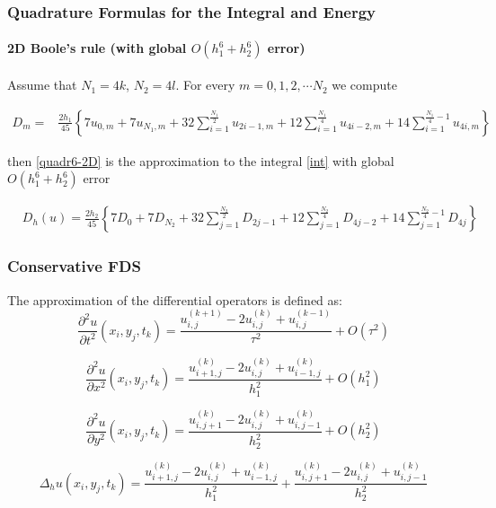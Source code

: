 \documentclass{beamer}
\begin{document}
\begin{frame}
\frametitle{Quadrature Formulas for the Integral and Energy}
\framesubtitle{2D Boole's rule (with global $O(h_1^6+h_2^6)$ error)}

Assume that $N_1=4k$, $N_2=4 l$.
For every $m=0,1,2,\cdots N_2$ we compute

\begin{align*}
D_m =& \frac{2h_1}{45} 
\left\{
7u_{0,m}+7u_{N_1,m}+32 \sum_{i=1}^{\frac{N_1}{2}}u_{2i-1,m}
+12\sum_{i=1}^{\frac{N_1}{4}}u_{4i-2,m}
+14 \sum_{i=1}^{\frac{N_1}{4}-1}u_{4i,m}
\right\}
\end{align*}

then \eqref{quadr6-2D} is the approximation to the integral \eqref{int} with global $O(h_1^6+h_2^6)$ error

\begin{align}\label{quadr6-2D}
&D_h(u) =
\frac{2h_2}{45} 
\left\{
7D_{0}+7D_{N_2}+32 \sum_{j=1}^{\frac{N_2}{2}}D_{2j-1}
+12\sum_{j=1}^{\frac{N_2}{4}}D_{4j-2}
+14 \sum_{j=1}^{\frac{N_2}{4}-1}D_{4j}
\right\}
\end{align}
\end{frame}


\begin{frame}
\frametitle{Conservative FDS}
The approximation of the differential operators is defined as:
\begin{equation}
\frac{\partial^2 u}{\partial t^2}(x_i, y_j, t_k ) = \frac{ u^{(k+1)}_{i, j} - 2u^{(k)}_{i,j} + u^{(k-1)}_{i,j} }{\tau^2} + O(\tau^2) 
\end{equation}

\begin{equation}
\frac{\partial^2 u}{\partial x^2}(x_i, y_j, t_k ) = \frac{ u^{(k)}_{i+1, j} - 2u^{(k)}_{i,j} + u^{(k)}_{i-1,j} }{h_1^2} + O(h_1^2) 
\end{equation}

\begin{equation}
\frac{\partial^2 u}{\partial y^2}(x_i, y_j, t_k ) = \frac{ u^{(k)}_{i, j+1} - 2u^{(k)}_{i,j} + u^{(k)}_{i,j-1} }{h_2^2} + O(h_2^2) 
\end{equation}


\begin{equation}
\Delta_h u(x_i, y_j, t_k )  = \frac{ u^{(k)}_{i+1, j} - 2u^{(k)}_{i,j} + u^{(k)}_{i-1,j} }{h_1^2} + \frac{ u^{(k)}_{i, j+1} - 2u^{(k)}_{i,j} + u^{(k)}_{i,j-1} }{h_2^2}
\end{equation}

\end{frame}
\end{document}
